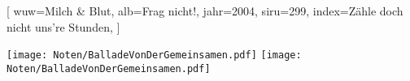 [
    wuw={Milch \& Blut}, 
    alb={Frag nicht!}, 
    jahr={2004}, 
    siru={299}, 
    index={Zähle doch nicht uns're Stunden},
]




\beginverse
\endverse
\texttt{[image: Noten/BalladeVonDerGemeinsamen.pdf]}
\texttt{[image: Noten/BalladeVonDerGemeinsamen.pdf]}

